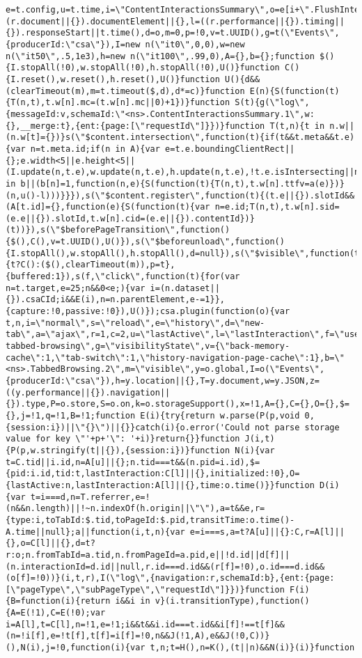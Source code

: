 \documentclass[
]{article}
\begin{document}
\begin{verbatim}
e=t.config,u=t.time,i=\"ContentInteractionsSummary\",o=e[i+\".FlushInterval\"]||5e3,c=e[i+\".FlushBackoff\"]||1.5,r=t.global,s=t.on,a=Math.floor,f=(r.document||{}).documentElement||{},l=((r.performance||{}).timing||{}).responseStart||t.time(),d=o,m=0,p=!0,v=t.UUID(),g=t(\"Events\",{producerId:\"csa\"}),I=new n(\"it0\",0,0),w=new n(\"it50\",.5,1e3),h=new n(\"it100\",.99,0),A={},b={};function $(){I.stopAll(!0),w.stopAll(!0),h.stopAll(!0),U()}function C(){I.reset(),w.reset(),h.reset(),U()}function U(){d&&(clearTimeout(m),m=t.timeout($,d),d*=c)}function E(n){S(function(t){T(n,t),t.w[n].mc=(t.w[n].mc||0)+1})}function S(t){g(\"log\",{messageId:v,schemaId:\"<ns>.ContentInteractionsSummary.1\",w:{},__merge:t},{ent:{page:[\"requestId\"]}})}function T(t,n){t in n.w||(n.w[t]={})}s(\"$content.intersection\",function(t){if(t&&t.meta&&t.e){var n=t.meta.id;if(n in A){var e=t.e.boundingClientRect||{};e.width<5||e.height<5||(I.update(n,t.e),w.update(n,t.e),h.update(n,t.e),!t.e.isIntersecting||n in b||(b[n]=1,function(n,e){S(function(t){T(n,t),t.w[n].ttfv=a(e)})}(n,u()-l)))}}}),s(\"$content.register\",function(t){(t.e||{}).slotId&&(A[t.id]={},function(e){S(function(t){var n=e.id;T(n,t),t.w[n].sid=(e.e||{}).slotId,t.w[n].cid=(e.e||{}).contentId})}(t))}),s(\"$beforePageTransition\",function(){$(),C(),v=t.UUID(),U()}),s(\"$beforeunload\",function(){I.stopAll(),w.stopAll(),h.stopAll(),d=null}),s(\"$visible\",function(t){t?C():($(),clearTimeout(m)),p=t},{buffered:1}),s(f,\"click\",function(t){for(var n=t.target,e=25;n&&0<e;){var i=(n.dataset||{}).csaCId;i&&E(i),n=n.parentElement,e-=1}},{capture:!0,passive:!0}),U()});csa.plugin(function(o){var t,n,i=\"normal\",s=\"reload\",e=\"history\",d=\"new-tab\",a=\"ajax\",r=1,c=2,u=\"lastActive\",l=\"lastInteraction\",f=\"used\",p=\"csa-tabbed-browsing\",g=\"visibilityState\",v={\"back-memory-cache\":1,\"tab-switch\":1,\"history-navigation-page-cache\":1},b=\"<ns>.TabbedBrowsing.2\",m=\"visible\",y=o.global,I=o(\"Events\",{producerId:\"csa\"}),h=y.location||{},T=y.document,w=y.JSON,z=((y.performance||{}).navigation||{}).type,P=o.store,S=o.on,k=o.storageSupport(),x=!1,A={},C={},O={},$={},j=!1,q=!1,B=!1;function E(i){try{return w.parse(P(p,void 0,{session:i})||\"{}\")||{}}catch(i){o.error('Could not parse storage value for key \"'+p+'\": '+i)}return{}}function J(i,t){P(p,w.stringify(t||{}),{session:i})}function N(i){var t=C.tid||i.id,n=A[u]||{};n.tid===t&&(n.pid=i.id),$={pid:i.id,tid:t,lastInteraction:C[l]||{},initialized:!0},O={lastActive:n,lastInteraction:A[l]||{},time:o.time()}}function D(i){var t=i===d,n=T.referrer,e=!(n&&n.length)||!~n.indexOf(h.origin||\"\"),a=t&&e,r={type:i,toTabId:$.tid,toPageId:$.pid,transitTime:o.time()-A.time||null};a||function(i,t,n){var e=i===s,a=t?A[u]||{}:C,r=A[l]||{},o=C[l]||{},d=t?r:o;n.fromTabId=a.tid,n.fromPageId=a.pid,e||!d.id||d[f]||(n.interactionId=d.id||null,r.id===d.id&&(r[f]=!0),o.id===d.id&&(o[f]=!0))}(i,t,r),I(\"log\",{navigation:r,schemaId:b},{ent:{page:[\"pageType\",\"subPageType\",\"requestId\"]}})}function F(i){B=function(i){return i&&i in v}(i.transitionType),function(){A=E(!1),C=E(!0);var i=A[l],t=C[l],n=!1,e=!1;i&&t&&i.id===t.id&&i[f]!==t[f]&&(n=!i[f],e=!t[f],t[f]=i[f]=!0,n&&J(!1,A),e&&J(!0,C))}(),N(i),j=!0,function(i){var t,n;t=H(),n=K(),(t||n)&&N(i)}(i)}function 
\end{verbatim}
\end{document}
